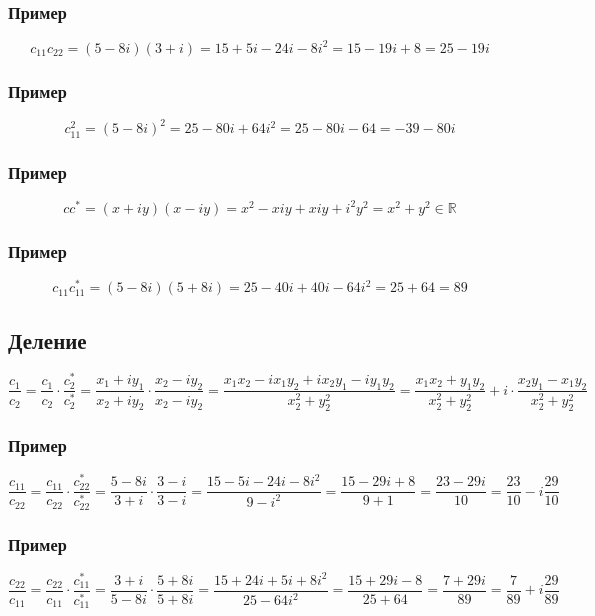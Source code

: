 \documentclass{article}
\begin{document}
\subsubsection{Пример}
\[
    c_{11} c_{22} = (5 - 8i)(3 + i) = 15 + 5i - 24i - 8i^2 = 15 - 19i + 8 = 25 - 19i
\]

\subsubsection{Пример}
\[
    c^2_{11} = (5 - 8i)^2 = 25 - 80i + 64i^2 = 25 - 80i - 64 = -39 - 80i
\]

\subsubsection{Пример}
\[
    c c^* = (x + iy)(x - iy) = x^2 - xiy + xiy + i^2 y^2 = x^2 + y^2 \in \mathbb{R}
\]

\subsubsection{Пример}
\[
    c_{11} c^*_{11} = (5 - 8i)(5 + 8i) = 25 - 40i + 40i - 64i^2 = 25 + 64 = 89
\]


\subsection{Деление}
\[
    \frac{c_1}{c_2} = 
    \frac{c_1}{c_2} \cdot \frac{c^*_2}{c^*_2} = 
    \frac{x_1 + iy_1}{x_2 + iy_2} \cdot \frac{x_2 - iy_2}{x_2 - iy_2} =
    \frac{x_1 x_2 - i x_1 y_2 + i x_2 y_1 - i y_1 y_2}{x^2_2 + y^2_2} =
    \frac{x_1 x_2 + y_1 y_2}{x^2_2 + y^2_2} + i \cdot \frac{x_2 y_1 - x_1 y_2}{x^2_2 + y^2_2}
\]

\subsubsection{Пример}
\[
    \frac{c_{11}}{c_{22}} = 
    \frac{c_{11}}{c_{22}} \cdot \frac{c^*_{22}}{c^*_{22}} =
    \frac{5 - 8i}{3 + i} \cdot \frac{3 - i}{3 - i} =
    \frac{15 - 5i - 24i - 8i^2}{9 - i^2} =
    \frac{15 - 29i + 8}{9 + 1} =
    \frac{23 - 29i}{10} =
    \frac{23}{10} - i \frac{29}{10}
\]

\subsubsection{Пример}
\[
    \frac{c_{22}}{c_{11}} = 
    \frac{c_{22}}{c_{11}} \cdot \frac{c^*_{11}}{c^*_{11}} =
    \frac{3 + i}{5 - 8i} \cdot \frac{5 + 8i}{5 + 8i} =
    \frac{15 + 24i + 5i + 8i^2}{25 - 64i^2} =
    \frac{15 + 29i - 8}{25 + 64} =
    \frac{7 + 29i}{89} =
    \frac{7}{89} + i \frac{29}{89}
\]
\end{document}
